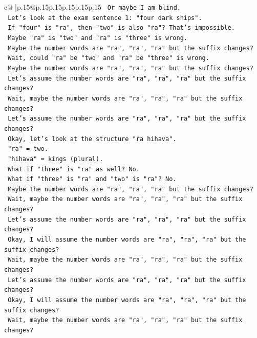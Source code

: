 \documentclass{article}
\begin{document}
{\begin{supertabular}{c@{$\;$}|p{.15\linewidth}@{}p{.15\linewidth}p{.15\linewidth}p{.15\linewidth}p{.15\linewidth}p{.15\linewidth}}
{{{\texttt{    Or maybe I am blind.} \\
\texttt{    Let's look at the exam sentence 1: "four dark ships".} \\
\texttt{    If "four" is "ra", then "two" is also "ra"? That's impossible.} \\
\texttt{    Maybe "ra" is "two" and "ra" is "three" is wrong.} \\
\texttt{    Maybe the number words are "ra", "ra", "ra" but the suffix changes?} \\
\texttt{    Wait, could "ra" be "two" and "ra" be "three" is wrong.} \\
\texttt{    Maybe the number words are "ra", "ra", "ra" but the suffix changes?} \\
\texttt{    Let's assume the number words are "ra", "ra", "ra" but the suffix changes?} \\
\texttt{    Wait, maybe the number words are "ra", "ra", "ra" but the suffix changes?} \\
\texttt{    Let's assume the number words are "ra", "ra", "ra" but the suffix changes?} \\
\texttt{    Okay, let's look at the structure "ra hihava".} \\
\texttt{    "ra" = two.} \\
\texttt{    "hihava" = kings (plural).} \\
\texttt{    What if "three" is "ra" as well? No.} \\
\texttt{    What if "three" is "ra" and "two" is "ra"? No.} \\
\texttt{    Maybe the number words are "ra", "ra", "ra" but the suffix changes?} \\
\texttt{    Wait, maybe the number words are "ra", "ra", "ra" but the suffix changes?} \\
\texttt{    Let's assume the number words are "ra", "ra", "ra" but the suffix changes?} \\
\texttt{    Okay, I will assume the number words are "ra", "ra", "ra" but the suffix changes?} \\
\texttt{    Wait, maybe the number words are "ra", "ra", "ra" but the suffix changes?} \\
\texttt{    Let's assume the number words are "ra", "ra", "ra" but the suffix changes?} \\
\texttt{    Okay, I will assume the number words are "ra", "ra", "ra" but the suffix changes?} \\
\texttt{    Wait, maybe the number words are "ra", "ra", "ra" but the suffix changes?} \\
}}}
\end{supertabular}}
\end{document}
